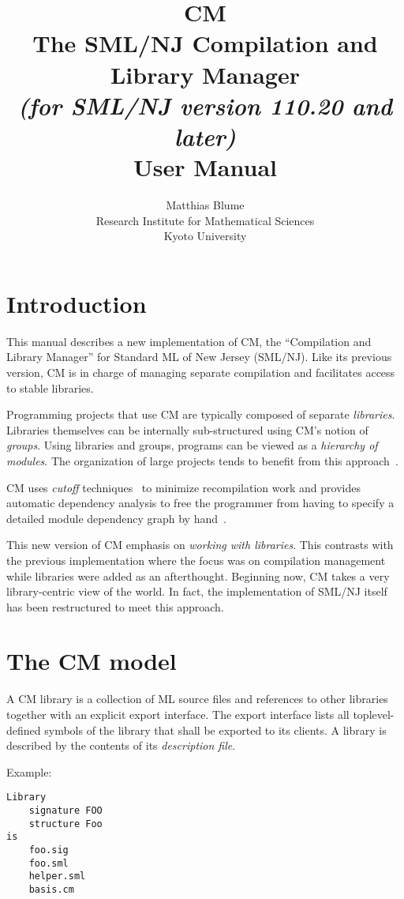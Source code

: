 \documentclass{article}
\author{Matthias Blume \\
Research Institute for Mathematical Sciences \\
Kyoto University}
\title{{\bf CM}\\
The SML/NJ Compilation and Library Manager \\
{\it\small (for SML/NJ version 110.20 and later)} \\
User Manual}
\begin{document}


\maketitle

\section{Introduction}

This manual describes a new implementation of CM, the ``Compilation
and Library Manager'' for Standard ML of New Jersey (SML/NJ).  Like its
previous version, CM is in charge of managing separate compilation and
facilitates access to stable libraries.

Programming projects that use CM are typically composed of separate
{\em libraries}.  Libraries themselves can be internally
sub-structured using CM's notion of {\em groups}.  Using libraries and
groups, programs can be viewed as a {\em hierarchy of modules}.  The
organization of large projects tends to benefit from this
approach~\cite{blume:appel:cm99}.

CM uses {\em cutoff} techniques~\cite{tichy94} to minimize
recompilation work and provides automatic dependency analysis to free
the programmer from having to specify a detailed module dependency
graph by hand~\cite{blume:depend99}.

This new version of CM emphasis on {\em working with libraries}.  This
contrasts with the previous implementation where the focus was on
compilation management while libraries were added as an afterthought.
Beginning now, CM takes a very library-centric view of the world.  In
fact, the implementation of SML/NJ itself has been restructured to
meet this approach.

\section{The CM model}

A CM library is a collection of ML source files and references to
other libraries together with an explicit export interface.  The
export interface lists all toplevel-defined symbols of the library
that shall be exported to its clients.  A library is described by the
contents of its {\em description file}.

\noindent Example:

\begin{verbatim}
Library
    signature FOO
    structure Foo
is
    foo.sig
    foo.sml
    helper.sml
    basis.cm
\end{verbatim}
\end{document}
